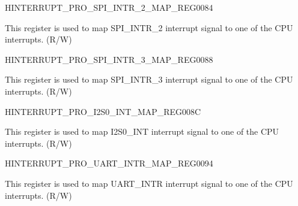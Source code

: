 \begin{register}{H}{INTERRUPT\_PRO\_SPI\_INTR\_2\_MAP\_REG}{\hexprefix{}0084}\label{regdesc:INTERRUPTPROSPIINTR2MAPREG}
%
%
\regnewline%
\begin{regdesc}\begin{reglist}
\label{fielddesc:INTERRUPTPROSPIINTR2MAP}\item [INTERRUPT\_PRO\_SPI\_INTR\_2\_MAP] This register is used to map SPI\_INTR\_2 interrupt signal to one of the CPU interrupts. (R/W)
\end{reglist}\end{regdesc}
\end{register}


\begin{register}{H}{INTERRUPT\_PRO\_SPI\_INTR\_3\_MAP\_REG}{\hexprefix{}0088}\label{regdesc:INTERRUPTPROSPIINTR3MAPREG}
%
%
\regnewline%
\begin{regdesc}\begin{reglist}
\label{fielddesc:INTERRUPTPROSPIINTR3MAP}\item [INTERRUPT\_PRO\_SPI\_INTR\_3\_MAP] This register is used to map SPI\_INTR\_3 interrupt signal to one of the CPU interrupts. (R/W)
\end{reglist}\end{regdesc}
\end{register}


\begin{register}{H}{INTERRUPT\_PRO\_I2S0\_INT\_MAP\_REG}{\hexprefix{}008C}\label{regdesc:INTERRUPTPROI2S0INTMAPREG}
%
%
\regnewline%
\begin{regdesc}\begin{reglist}
\label{fielddesc:INTERRUPTPROI2S0INTMAP}\item [INTERRUPT\_PRO\_I2S0\_INT\_MAP] This register is used to map I2S0\_INT interrupt signal to one of the CPU interrupts. (R/W)
\end{reglist}\end{regdesc}
\end{register}




\begin{register}{H}{INTERRUPT\_PRO\_UART\_INTR\_MAP\_REG}{\hexprefix{}0094}\label{regdesc:INTERRUPTPROUARTINTRMAPREG}
%
%
\regnewline%
\begin{regdesc}\begin{reglist}
\label{fielddesc:INTERRUPTPROUARTINTRMAP}\item [INTERRUPT\_PRO\_UART\_INTR\_MAP] This register is used to map UART\_INTR interrupt signal to one of the CPU interrupts. (R/W)
\end{reglist}\end{regdesc}
\end{register}


